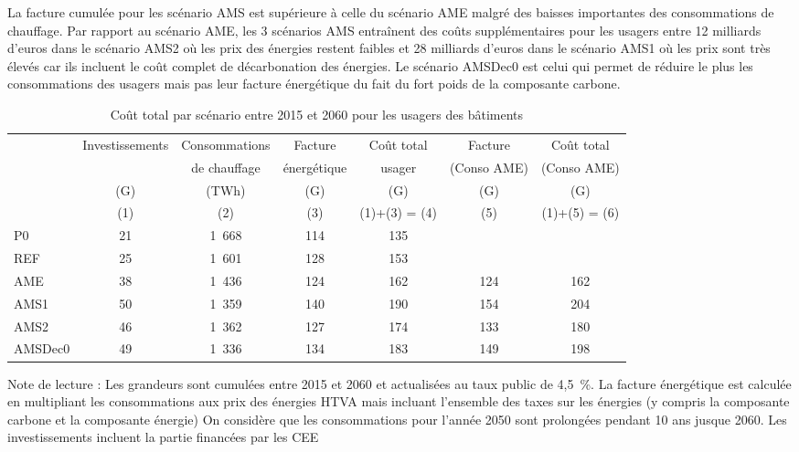 \documentclass[10.5pt,a4paper]{article}
\def\euro{\mbox{\raisebox{.25ex}{{\it =}}\hspace{-.5em}{\sf C}}}
\begin{document}
{La facture cumulée pour les scénario AMS est supérieure à celle du scénario AME malgré des baisses importantes des consommations de chauffage.  Par rapport au scénario AME, les 3 scénarios AMS entraînent des coûts supplémentaires pour les usagers entre 12 milliards d'euros dans le scénario AMS2 où les prix des énergies restent faibles et 28 milliards d'euros dans le scénario AMS1 où les prix sont très élevés car ils incluent le coût complet de décarbonation des énergies.  Le scénario AMSDec0 est celui qui permet de réduire le plus les consommations des usagers mais pas leur facture énergétique du fait du fort poids de la composante carbone. 

\begin{table}[h] \caption{Coût total par scénario entre 2015 et 2060 pour les usagers des bâtiments}\label{Bilan_usager}
\begin{center}
\scriptsize
\begin{tabular}[c]{|l|c|c|c|c|c|c|}
\hline
					& Investissements &  Consommations 		&	Facture  		 & Coût total & Facture 		& Coût total  \\
					&									& 	de chauffage		& énergétique & 	 usager		& (Conso AME)	&	(Conso AME) \\
					&		(G\euro)		&			(TWh)				&		(G\euro) 					& (G\euro)	 	& (G\euro) 					& (G\euro) \\
					&    (1) 				&      (2)        &      (3)            & (1)+(3) = (4) &  (5) & (1)+(5) = (6) \\
\hline
P0 				&			21				&			1~668 			&			114   					&			135  		&		  						&		\\
REF 			&			25 				&			1~601 			&			128   					&			153  		&		  						&	 \\
AME 			&			38 				&			1~436 			&			124   					&			162  		&		124  						&	162 \\
AMS1 			&			50 				&			1~359 			&			140   					&			190  		&		154  						& 204 \\
AMS2 			&			46 				&			1~362 			&			127		 					&			174  		&		133  						&	180 \\
AMSDec0 	&			49 				&			1~336 			&			134   					&			183  		&		149  						&	198 \\
\hline
\end{tabular}
\end{center}
\footnotesize{Note de lecture : Les grandeurs sont cumulées entre 2015 et 2060 et actualisées au taux public de 4,5~\%.  La facture énergétique est calculée en multipliant les consommations aux prix des énergies HTVA mais incluant l'ensemble des taxes sur les énergies (y compris la composante carbone et la composante énergie)  On considère que les consommations pour l'année 2050 sont prolongées pendant 10 ans jusque 2060. Les investissements incluent la partie financées par les CEE}
\end{table}


}
\end{document}
